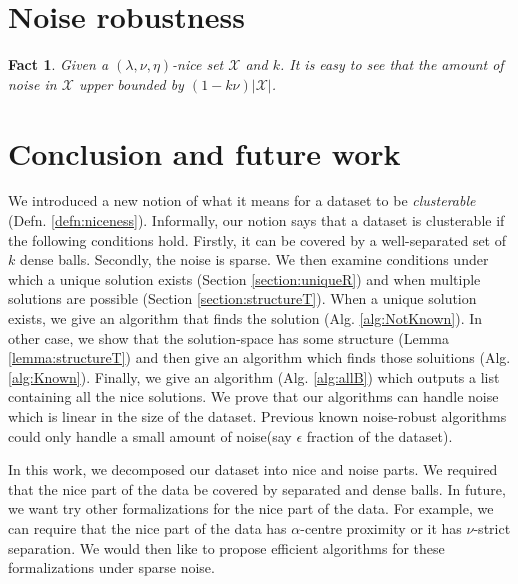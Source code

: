 \documentclass[twoside]{article}
\newcommand{\mc}{\mathcal}
\newtheorem{fact}[theorem]{Fact}
\begin{document}
\section{Noise robustness}
\begin{fact}
Given a $(\lambda, \nu, \eta)$-nice set $\mc X$ and $k$. It is easy to see that the amount of noise in $\mc X$ upper bounded by $(1-k\nu)|\mc X|$. 
\end{fact}


\section{Conclusion and future work}
We introduced a new notion of what it means for a dataset to be {\it clusterable} (Defn. \ref{defn:niceness}). Informally, our notion says that a dataset is clusterable if the following conditions hold. Firstly, it can be covered by a well-separated set of $k$ dense balls. Secondly, the noise is sparse. We then examine conditions under which a unique solution exists (Section \ref{section:uniqueR}) and when multiple solutions are possible (Section \ref{section:structureT}). When a unique solution exists, we give an algorithm that finds the solution (Alg. \ref{alg:NotKnown}). In other case, we show that the solution-space has some structure (Lemma \ref{lemma:structureT}) and then give an algorithm which finds those soluitions (Alg. \ref{alg:Known}). Finally, we give an algorithm (Alg. \ref{alg:allB}) which outputs a list containing all the nice solutions. We prove that our algorithms can handle noise which is linear in the size of the dataset. Previous known noise-robust algorithms could only handle a small amount of noise(say $\epsilon$ fraction of the dataset).

In this work, we decomposed our dataset into nice and noise parts. We required that the nice part of the data be covered by separated and dense balls. In future, we want try other formalizations for the nice part of the data. For example, we can require that the nice part of the data has $\alpha$-centre proximity or it has $\nu$-strict separation. We would then like to propose efficient algorithms for these formalizations under sparse noise.

 


\end{document}
